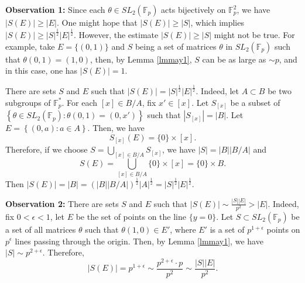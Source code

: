 \documentclass[11pt]{article}
\def\Fbb{\mathbb{F}}
\def\SL{SL}
\def\l({\left(}
\def\r){\right)}
\def\lv{\left\vert}
\def\rv{\right\vert}
\def\lo{\left\{}
\def\ro{\right\}}
\begin{document}
    
{\bf Observation 1:} Since each $\theta\in SL_2(\mathbb{F}_p)$ acts bijectively on $\mathbb{F}_p^2$, we have $|S(E)|\ge |E|$. One might hope that $|S(E)|\ge |S|$, which implies $|S(E)|\ge |S|^{\frac{1}{2}}|E|^{\frac{1}{2}}$. However, the estimate $|S(E)|\ge |S|$ might not be true. For example, take $E=\{(0, 1)\}$ and $S$ being a set of matrices $\theta$ in $SL_2(\mathbb{F}_p)$ such that $\theta (0, 1)=(1, 0)$, then, by Lemma \ref{lmmay1}, $S$ can be as large as $\sim p$, and in this case, one has $|S(E)|=1$. 



There are sets $S$ and $E$ such that $|S(E)|=|S|^{\frac{1}{2}}|E|^{\frac{1}{2}}$. Indeed, let $A\subset B $ be two subgroups of $\Fbb_p^*$. For each $[x] \in B/A$, fix $x' \in [x]$. Let $S_{[x]}$ be a subset of $\lo \theta \in \SL_2 \l( \Fbb_p \r) \colon \theta (0,1) =(0,x') \ro$ such that $\lv S_{[x]} \rv = \lv B\rv$. Let $E= \lo  (0,a) \colon a\in A \ro$. Then, we have
    \[ S_{[x]} (E) = \{ 0\} \times [x] .\]
    Therefore, if we choose $S = \bigcup_{[x]\in B/A} S_{[x]}  $, we have $\lv S \rv = \lv B\rv\lv B/A\rv$ and
    \[ S (E) = \bigcup_{[x]\in B/A} \{ 0\} \times [x] =\{ 0\} \times B. \]
    Then $\lv S (E)\rv = \lv B\rv = (\lv B\rv \lv B/A\rv)^{\frac{1}{2}} \lv A\rv^{\frac{1}{2}} = \lv S \rv^{\frac{1}{2}} \lv E \rv^{\frac{1}{2}} $.

{\bf Observation 2:} There are sets $S$ and $E$ such that $\lv S(E) \rv \sim \frac{\lv S\rv \lv E \rv}{p^2}>|E|$. Indeed, fix $0<\epsilon<1$, let $E$ be the set of points on the line $\{y=0\}$. Let $S \subset \SL_2 \l( \Fbb_p \r)$ be a set of all matrices $\theta$ such that $\theta (1,0) \in E'$, where $E'$ is a set of $p^{1+\epsilon}$ points on $p^{\epsilon}$ lines passing through the origin. Then, by Lemma \ref{lmmay1}, we have $\lv S\rv \sim p^{2+\epsilon}$. Therefore,
\[ \lv S(E)\rv =p^{1+\epsilon} \sim \frac{p^{2+\epsilon}\cdot p}{p^2} \sim \frac{\lv S\rv \lv E\rv}{p^2}. \]
\end{document}
